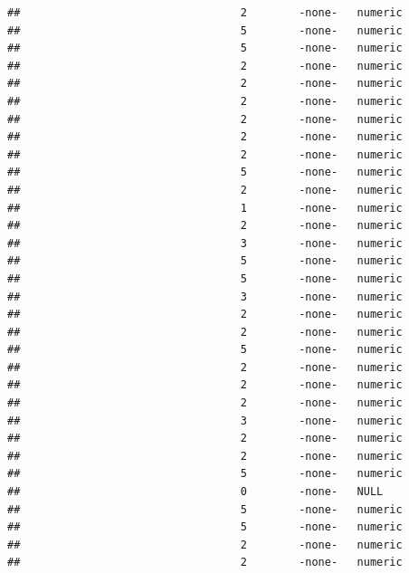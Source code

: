 \documentclass[
  12pt,
]{article}
\begin{document}
\begin{verbatim}
##                                  2        -none-   numeric                    
##                                  5        -none-   numeric                    
##                                  5        -none-   numeric                    
##                                  2        -none-   numeric                    
##                                  2        -none-   numeric                    
##                                  2        -none-   numeric                    
##                                  2        -none-   numeric                    
##                                  2        -none-   numeric                    
##                                  2        -none-   numeric                    
##                                  5        -none-   numeric                    
##                                  2        -none-   numeric                    
##                                  1        -none-   numeric                    
##                                  2        -none-   numeric                    
##                                  3        -none-   numeric                    
##                                  5        -none-   numeric                    
##                                  5        -none-   numeric                    
##                                  3        -none-   numeric                    
##                                  2        -none-   numeric                    
##                                  2        -none-   numeric                    
##                                  5        -none-   numeric                    
##                                  2        -none-   numeric                    
##                                  2        -none-   numeric                    
##                                  2        -none-   numeric                    
##                                  3        -none-   numeric                    
##                                  2        -none-   numeric                    
##                                  2        -none-   numeric                    
##                                  5        -none-   numeric                    
##                                  0        -none-   NULL                       
##                                  5        -none-   numeric                    
##                                  5        -none-   numeric                    
##                                  2        -none-   numeric                    
##                                  2        -none-   numeric                    

\end{verbatim}
\end{document}
